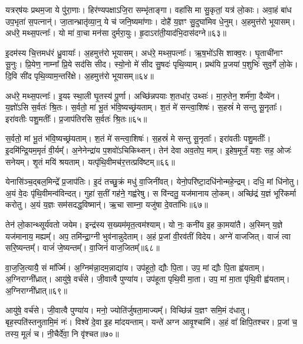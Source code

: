 यत्रर्‌\mbox{}ष॑यः प्रथम॒जा ये पु॑रा॒णाः।
हिर॑ण्यपक्षा\-ऽजि॒रा सम्भृ॑ताङ्गा।
वहा॑सि मा सु॒कृतां॒ यत्र॑ लो॒काः।
अवा॒हं बा॑ध उप॒भृता॑ स॒पत्नान्॑।
जा॒तान्भ्रातृ॑व्या॒न्॒ ये च॑ जनि॒ष्यमा॑णाः।
दोहै॑ य॒ज्ञꣳ सु॒दुघा॑मिव धे॒नुम्।
अ॒हमुत्त॑रो भूयासम्।
अध॑रे॒ मथ्स॒पत्नाः᳚।
यो मा॑ वा॒चा मन॑सा दुर्मरा॒युः।
हृ॒दा\-ऽरा॑ती॒याद॑भि॒दास॑दग्ने॥६३॥

इ॒दम॑स्य चि॒त्तमध॑रं ध्रु॒वायाः᳚।
अ॒हमुत्त॑रो भूयासम्।
अध॑रे॒ मथ्स॒पत्नाः᳚।
ऋ॒ष॒भो॑ऽसि शाक्व॒रः।
घृ॒ताची॑नाꣳ सू॒नुः।
प्रि॒येण॒ नाम्ना᳚ प्रि॒ये सद॑सि सीद।
स्यो॒नो मे॑ सीद सु॒षदः॑ पृथि॒व्याम्।
प्रथ॑यि प्र॒जया॑ प॒शुभिः॑ सुव॒र्गे लो॒के।
दि॒वि सी॑द पृथि॒व्याम॒न्तरि॑क्षे।
अ॒हमुत्त॑रो भूयासम्॥६४॥

अध॑रे॒ मथ्स॒पत्नाः᳚।
इ॒यꣴ स्था॒ली घृ॒तस्य॑ पू॒र्णा।
अच्छि॑न्नपयाः श॒तधा॑र॒ उथ्सः॑।
मा॒रु॒तेन॒ शर्म॑णा॒ दैव्ये॑न।
य॒ज्ञो॑ऽसि स॒र्वतः॑ श्रि॒तः।
स॒र्वतो॒ मां भू॒तं भ॑वि॒ष्यच्छ्र॑यताम्।
श॒तं मे॑ सन्त्वा॒शिषः॑।
स॒हस्रं॑ मे सन्तु सू॒नृताः᳚।
इरा॑वतीः पशु॒मतीः᳚।
प्र॒जाप॑तिरसि स॒र्वतः॑ श्रि॒तः॥६५॥

स॒र्वतो॒ मां भू॒तं भ॑वि॒ष्यच्छ्र॑यताम्।
श॒तं मे॑ सन्त्वा॒शिषः॑।
स॒हस्रं॑ मे सन्तु सू॒नृताः᳚।
इरा॑वतीः पशु॒मतीः᳚।
इ॒दमि॑न्द्रि॒यम॒मृतं॑ वी॒र्यम्᳚।
अ॒नेनेन्द्रा॑य प॒शवो॑\-ऽचिकिथ्सन्।
तेन॑ देवा अव॒तोप॒ माम्।
इ॒हेष॒मूर्जं॒ यशः॒ सह॒ ओजः॑ सनेयम्।
शृ॒तं मयि॑ श्रयताम्।
यत्पृ॑थि॒वीमच॑र॒त्तत्प्रवि॑ष्टम्॥६६॥

येनासि॑ञ्च॒द्बल॒मिन्द्रे᳚ प्र॒जाप॑तिः।
इ॒दं तच्छु॒क्रं मधु॑ वा॒जिनी॑वत्।
येनो॒परि॑ष्टा॒दधि॑नोन्महे॒न्द्रम्।
दधि॒ मां धि॑नोतु।
अ॒यं वे॒दः पृ॑थि॒वीमन्व॑विन्दत्।
गुहा॑ स॒तीं गह॑ने॒ गह्व॑रेषु।
स वि॑न्दतु॒ यज॑मानाय लो॒कम्।
अच्छि॑द्रं य॒ज्ञं भूरि॑कर्मा करोतु।
अ॒यं य॒ज्ञः सम॑सदद्ध॒विष्मान्॑।
ऋ॒चा साम्ना॒ यजु॑षा दे॒वता॑भिः॥६७॥

तेन॑ लो॒कान्थ्सूर्य॑वतो जयेम।
इन्द्र॑स्य स॒ख्यम॑मृत॒त्वम॑\-श्याम्।
यो नः॒ कनी॑य इ॒ह का॒मया॑तै।
अ॒स्मिन् य॒ज्ञे यज॑मानाय॒ मह्यम्᳚।
अप॒ तमि॑न्द्रा॒ग्नी भुव॑नान्नुदेताम्।
अ॒हं प्र॒जां वी॒रव॑तीं विदेय।
अग्ने॑ वाजजित्।
वाजं॑ त्वा सरि॒ष्यन्तम्᳚।
वाजं॑ जे॒ष्यन्तम्᳚।
वा॒जिनं॑ वाज॒जितम्᳚॥६८॥

वा॒ज॒जि॒त्यायै॒ सं मा᳚र्ज्मि।
अ॒ग्निम॑न्ना॒दम॒न्नाद्या॑य।
उप॑हूतो॒ द्यौः पि॒ता।
उप॒ मां द्यौः पि॒ता ह्व॑यताम्।
अ॒ग्निराग्नी᳚ध्रात्।
आयु॑षे॒ वर्च॑से।
जी॒वात्वै पुण्या॑य।
उप॑हूता पृथि॒वी मा॒ता।
उप॒ मां मा॒ता पृ॑थि॒वी ह्व॑यताम्।
अ॒ग्निराग्नी᳚ध्रात्॥६९॥

आयु॑षे॒ वर्च॑से।
जी॒वात्वै पुण्या॑य।
मनो॒ ज्योति॑र्जुषता॒मा\-ज्यम्᳚।
विच्छि॑न्नं य॒ज्ञꣳ समि॒मं द॑धातु।
बृह॒स्पति॑स्तनुतामि॒मं नः॑।
विश्वे॑ दे॒वा इ॒ह मा॑दयन्ताम्।
यन्ते॑ अग्न आवृ॒श्चामि॑।
अ॒हं वा᳚ क्षिपि॒तश्चर\sn{}।
प्र॒जां च॒ तस्य॒ मूलं॑ च।
नी॒चैर्दे॑वा॒ नि वृ॑श्चत॥७०॥

